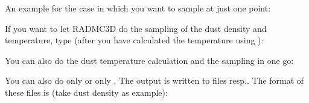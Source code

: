 \documentclass[letterpaper,10pt,english]{sphinxmanual}
\begin{document}
An example for the case in which you want to sample at just one point:

\begin{sphinxVerbatim}[commandchars=\\\{\}]
      
\end{sphinxVerbatim}

If you want to let RADMC\sphinxhyphen{}3D do the sampling of the dust density and
temperature, type (after you have calculated the temperature using
):

\begin{sphinxVerbatim}[commandchars=\\\{\}]
  
\end{sphinxVerbatim}

You can also do the dust temperature calculation and the sampling in one
go:

\begin{sphinxVerbatim}[commandchars=\\\{\}]
   
\end{sphinxVerbatim}

You can also do only  or only . The
output is written to files  resp.. The format of these files is (take dust
density as example):
\end{document}
